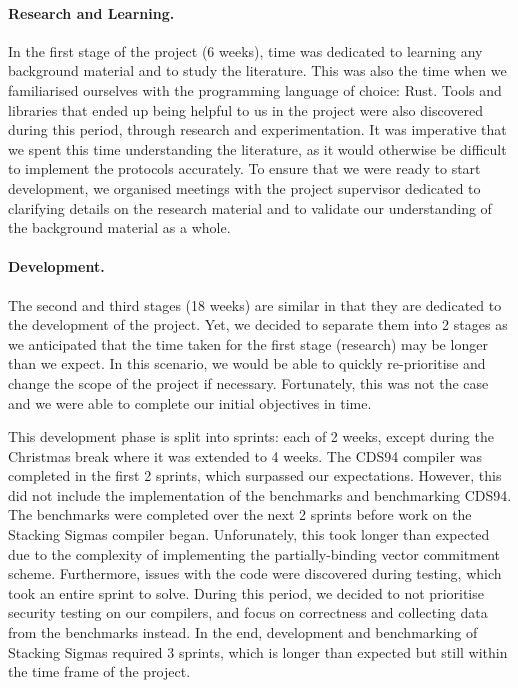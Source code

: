

\paragraph{Research and Learning.} In the first stage of the project (6 weeks), time was dedicated 
to learning any background material and to study the literature. 
This was also the time when we familiarised ourselves with the programming language of choice: Rust. 
Tools and libraries that ended up being helpful to us in the project were also discovered during 
this period, through research and experimentation. It was imperative that we spent this time 
understanding the literature, as it would otherwise be difficult to implement the protocols accurately.
To ensure that we were ready to start development, we organised meetings with the 
project supervisor dedicated to clarifying details on the research material and to validate 
our understanding of the background material as a whole.  

\paragraph{Development.} The second and third stages (18 weeks) are similar in that they are 
dedicated to the development of the project. Yet, we decided to separate them into 2 stages as 
we anticipated that the time taken for the first stage (research) may be longer than 
we expect. In this scenario, we would be able to quickly re-prioritise and change the scope of 
the project if necessary. Fortunately, this was not the case and we were able to complete 
our initial objectives in time. 

This development phase is split into sprints: each of 2 weeks, except during the Christmas break 
where it was extended to 4 weeks. The CDS94 compiler was completed in the first 2 sprints, 
which surpassed our expectations. However, this did not include the implementation of the 
benchmarks and benchmarking CDS94. The benchmarks were completed over the next 2 sprints 
before work on 
the Stacking Sigmas compiler began. Unforunately, this took longer than expected due to the 
complexity of 
implementing the partially-binding vector commitment scheme. Furthermore, 
issues with the code were discovered during testing, which took an entire sprint to solve. 
During this period, we decided to not prioritise security testing on our compilers, and focus 
on correctness and collecting data from the benchmarks instead. In the end, development and 
benchmarking of Stacking Sigmas required 3 sprints, which is longer than expected but still within 
the time frame of the project. 

